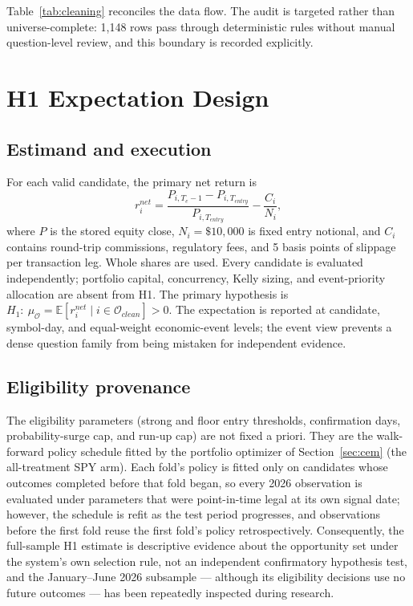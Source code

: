 \documentclass[sigconf,anonymous]{acmart}
\begin{document}
Table~\ref{tab:cleaning} reconciles the data flow. The audit is targeted rather than universe-complete: 1,148 rows pass through deterministic rules without manual question-level review, and this boundary is recorded explicitly.

\section{H1 Expectation Design}

\subsection{Estimand and execution}

For each valid candidate, the primary net return is
\[
r^{net}_i = \frac{P_{i,T_e-1}-P_{i,T_{entry}}}{P_{i,T_{entry}}}
-\frac{C_i}{N_i},
\]
where $P$ is the stored equity close, $N_i=\$10{,}000$ is fixed entry notional, and $C_i$ contains round-trip commissions, regulatory fees, and 5 basis points of slippage per transaction leg. Whole shares are used. Every candidate is evaluated independently; portfolio capital, concurrency, Kelly sizing, and event-priority allocation are absent from H1. The primary hypothesis is $H_1:\ \mu_{\mathcal O}=\mathbb{E}[r^{net}_i\mid i\in\mathcal O_{clean}]>0$. The expectation is reported at candidate, symbol-day, and equal-weight economic-event levels; the event view prevents a dense question family from being mistaken for independent evidence.

\subsection{Eligibility provenance}
\label{sec:provenance}

The eligibility parameters (strong and floor entry thresholds, confirmation days, probability-surge cap, and run-up cap) are not fixed a priori. They are the walk-forward policy schedule fitted by the portfolio optimizer of Section~\ref{sec:cem} (the all-treatment SPY arm). Each fold's policy is fitted only on candidates whose outcomes completed before that fold began, so every 2026 observation is evaluated under parameters that were point-in-time legal at its own signal date; however, the schedule is refit as the test period progresses, and observations before the first fold reuse the first fold's policy retrospectively. Consequently, the full-sample H1 estimate is descriptive evidence about the opportunity set under the system's own selection rule, not an independent confirmatory hypothesis test, and the January--June 2026 subsample --- although its eligibility decisions use no future outcomes --- has been repeatedly inspected during research.
\end{document}
